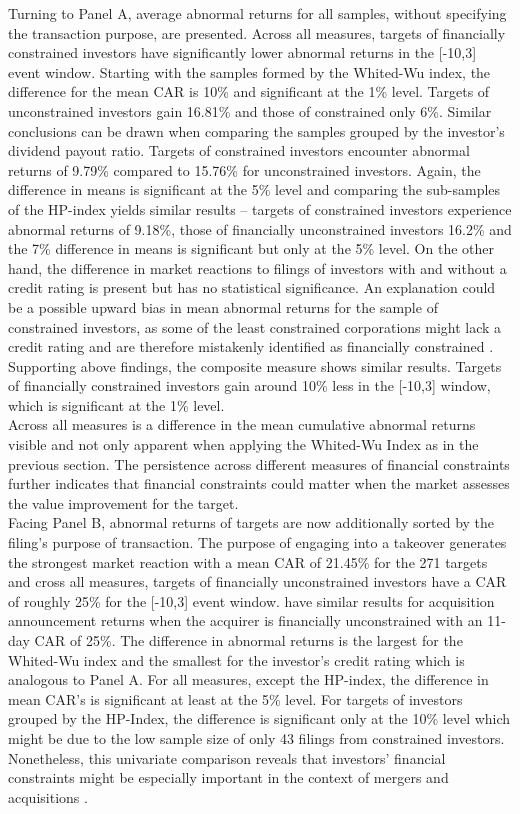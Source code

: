 \documentclass[12pt]{article}
\begin{document}
Turning to Panel A, average abnormal returns for all samples, without specifying the transaction purpose, are presented. Across all measures, targets of financially constrained investors have significantly lower abnormal returns in the [-10,3] event window. Starting with the samples formed by the Whited-Wu index, the difference for the mean CAR is 10\% and significant at the 1\% level. Targets of unconstrained investors gain 16.81\% and those of constrained only 6\%. Similar conclusions can be drawn when comparing the samples grouped by the investor's dividend payout ratio. Targets of constrained investors encounter abnormal returns of 9.79\% compared to 15.76\% for unconstrained investors. Again, the difference in means is significant at the 5\% level and comparing the sub-samples of the HP-index yields similar results -- targets of constrained investors experience abnormal returns of 9.18\%, those of financially unconstrained investors 16.2\% and the 7\% difference in means is significant but only at the 5\% level. On the other hand, the difference in market reactions to filings of investors with and without a credit rating is present but has no statistical significance. An explanation could be a possible upward bias in mean abnormal returns for the sample of constrained investors, as some of the least constrained corporations might lack a credit rating and are therefore mistakenly identified as financially constrained \citep[p.18]{heller2015}. Supporting above findings, the composite measure shows similar results. Targets of financially constrained investors gain around 10\% less in the [-10,3] window, which is significant at the 1\% level.\\
Across all measures is a difference in the mean cumulative abnormal returns visible and not only apparent when applying the Whited-Wu Index as in the previous section. The persistence across different measures of financial constraints further indicates that financial constraints could matter when the market assesses the value improvement for the target.\\
Facing Panel B, abnormal returns of targets are now additionally sorted by the filing's purpose of transaction. The purpose of engaging into a takeover generates the strongest market reaction with a mean CAR of 21.45\% for the 271 targets and cross all measures, targets of financially unconstrained investors have a CAR of roughly 25\% for the [-10,3] event window. \citet[p.112]{Khatami2014} have similar results for acquisition announcement returns when the acquirer is financially unconstrained with an 11-day CAR of 25\%. The difference in abnormal returns is the largest for the Whited-Wu index and the smallest for the investor's credit rating which is analogous to Panel A. For all measures, except the HP-index, the difference in mean CAR's is significant at least at the 5\% level. For targets of investors grouped by the HP-Index, the difference is significant only at the 10\% level which might be due to the low sample size of only 43 filings from constrained investors. Nonetheless, this univariate comparison reveals that investors' financial constraints might be especially important in the context of mergers and acquisitions \citep[p.112]{Khatami2014}.
\end{document}
